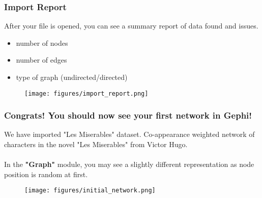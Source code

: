 \documentclass[10pt]{beamer}
\begin{document}

\begin{frame}
\frametitle{Import Report}

After your file is opened, you can see a summary report of data found and issues.
\begin{itemize}
	\item number of nodes
	\item number of edges
	\item type of graph (undirected/directed)
\end{itemize}
\begin{figure}
\texttt{[image: figures/import\_report.png]}
\end{figure}
\end{frame}


\begin{frame}
\frametitle{Congrats! You should now see your first network in Gephi!}

We have imported "Les Miserables" dataset. Co-appearance weighted network of
characters in the novel "Les Miserables" from Victor Hugo. \\~\\

In the \textbf{"Graph"} module, you may see a slightly different representation as node position is random at first.
\begin{figure}
\texttt{[image: figures/initial\_network.png]}
\end{figure}
\end{frame}
\end{document}
